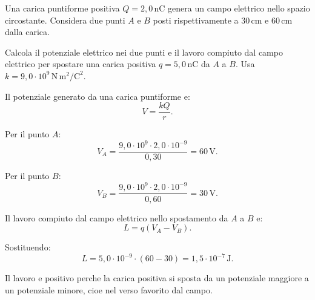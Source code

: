 
\begin{esercizio}
Una carica puntiforme positiva \(Q=2{,}0\,\mathrm{nC}\) genera un campo
elettrico nello spazio circostante. Considera due punti \(A\) e \(B\) posti
rispettivamente a \(30\,\mathrm{cm}\) e \(60\,\mathrm{cm}\) dalla carica.

Calcola il potenziale elettrico nei due punti e il lavoro compiuto dal campo
elettrico per spostare una carica positiva \(q=5{,}0\,\mathrm{nC}\) da
\(A\) a \(B\). Usa \(k=9{,}0\cdot 10^9\,\mathrm{N\,m^2/C^2}\).
\end{esercizio}

\begin{soluzione}
Il potenziale generato da una carica puntiforme e:
\[
V=\frac{kQ}{r}.
\]

Per il punto \(A\):
\[
V_A=\frac{9{,}0\cdot 10^9\cdot 2{,}0\cdot 10^{-9}}{0{,}30}
=60\,\mathrm{V}.
\]

Per il punto \(B\):
\[
V_B=\frac{9{,}0\cdot 10^9\cdot 2{,}0\cdot 10^{-9}}{0{,}60}
=30\,\mathrm{V}.
\]

Il lavoro compiuto dal campo elettrico nello spostamento da \(A\) a \(B\) e:
\[
L=q(V_A-V_B).
\]

Sostituendo:
\[
L=5{,}0\cdot 10^{-9}\cdot (60-30)
=1{,}5\cdot 10^{-7}\,\mathrm{J}.
\]

Il lavoro e positivo perche la carica positiva si sposta da un potenziale
maggiore a un potenziale minore, cioe nel verso favorito dal campo.
\end{soluzione}
